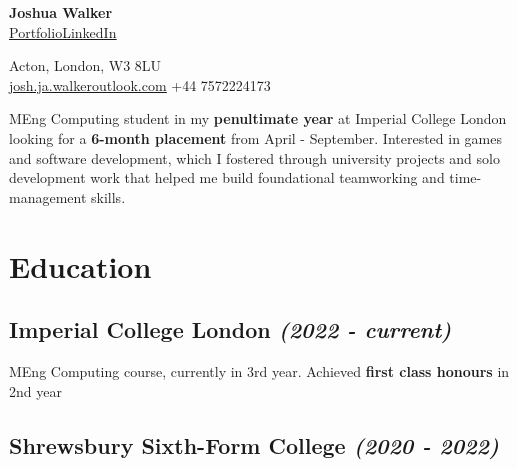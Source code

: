 \documentclass{article}
\makeatletter
\newcommand{\contact}[1]{\normalsize{#1}}
\newcommand{\contactdiv}{\hspace*{0.8em}}
\newcommand{\email}[2]{\href{mailto:#1@#2}{\underline{#1{\small\fontfamily{phv}\selectfont@}#2}}}
\newcommand{\linkedin}{\href{https://www.linkedin.com/in/joshua-walker-080714238/}{\underline{LinkedIn}}}
\newcommand{\portfolio}{\href{https://josh-ja-walker.github.io/portfolio/}{\underline{Portfolio}}}
\newcommand{\dates}[1]{\hfill\textit{(#1)}}
\newcommand{\tab}{\hspace{1.5em}}
\makeatother
\begin{document}
\begin{multicols}{2}

    \begin{flushleft}
        {\LARGE\textbf{Joshua Walker}}\\
        \vspace{0.5em}
        \portfolio\contactdiv\linkedin
    \end{flushleft}
    
    \columnbreak
    
    \begin{flushright}
        \contact{Acton, London, W3 8LU}\\
        \vspace{0.5em}
        \contact{\email{josh.ja.walker}{outlook.com}}
        \contactdiv
        \contact{+44 7572224173}
    \end{flushright}
    
\end{multicols}

\vspace{0.8em}

{\noindent}MEng Computing student in my \textbf{penultimate year} at Imperial College London looking for a \textbf{6-month placement} from April - September. 
Interested in games and software development, which I fostered through university projects and solo development work 
that helped me build foundational teamworking and time-management skills. 

\vspace{0.15em}


\section*{Education}

\subsection*{\textbf{Imperial College London} \dates{2022 - current}}

{\tab}MEng Computing course, currently in 3rd year. Achieved \textbf{first class honours} in 2nd year


\subsection*{\textbf{Shrewsbury Sixth-Form College} \dates{2020 - 2022}}
\end{document}

